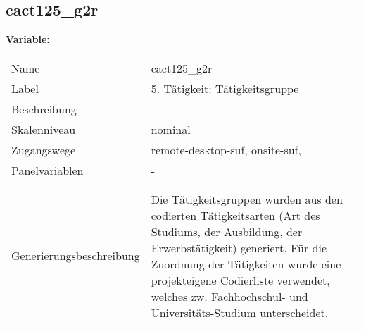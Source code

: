 	
	
	\subsection{cact125\_g2r}
	\label{subSection:cact125_g2r}

	\noindent\textbf{Variable:}\\
		\begin{tabular}{lL{11.3cm}}
			\label{tableVariable:cact125_g2r}
			Name & cact125\_g2r \\
			Label & 5. Tätigkeit: Tätigkeitsgruppe  \\
			Beschreibung & - \\
			Skalenniveau & nominal \\
			Zugangswege &
				remote-desktop-suf,
				onsite-suf,
 \\
			Panelvariablen & -
			 \\
			 \\
 \\
					Generierungsbeschreibung & Die Tätigkeitsgruppen wurden aus den codierten Tätigkeitsarten (Art des Studiums, der Ausbildung, der Erwerbstätigkeit) generiert. Für die Zuordnung der Tätigkeiten wurde eine projekteigene Codierliste verwendet, welches zw. Fachhochschul- und Universitäts-Studium unterscheidet.
				 \\	
			 \\
		\end{tabular}






